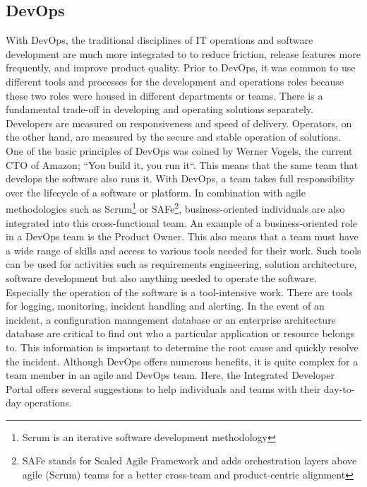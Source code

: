 \documentclass[a4paper,12pt]{article}
\begin{document}
    \subsection{DevOps}
    \label{subsec:devops}
    With DevOps, the traditional disciplines of IT operations and software development are much more integrated to
    to reduce friction, release features more frequently, and improve product quality\parencite{safedevops}.
    Prior to DevOps, it was common to use different tools and processes for the development and operations roles
    because these two roles were housed in different departments or teams.
    There is a fundamental trade-off in developing and operating solutions separately.
    Developers are measured on responsiveness and speed of delivery.
    Operators, on the other hand, are measured by the secure and stable operation of solutions.
    One of the basic principles of DevOps was coined by Werner Vogels, the current CTO of Amazon;
    ``You build it, you run it``\parencite{vogels}.
    This means that the same team that develops the software also runs it.
    With DevOps, a team takes full responsibility over the lifecycle of a software or platform.
    In combination with agile methodologies such as Scrum\footnote{Scrum is an iterative software development methodology}
    or SAFe\footnote{SAFe stands for Scaled Agile Framework and adds orchestration layers above agile (Scrum) teams for
    a better cross-team and product-centric alignment}, business-oriented individuals are also integrated into this
    cross-functional team.
    An example of a business-oriented role in a DevOps team is the Product Owner\parencite{safepo}.
    This also means that a team must have a wide range of skills and access to various tools needed for their work.
    Such tools can be used for activities such as requirements engineering, solution architecture, software development
    but also anything needed to operate the software.
    Especially the operation of the software is a tool-intensive work.
    There are tools for logging, monitoring, incident handling and alerting.
    In the event of an incident, a configuration management database or an enterprise architecture database are critical
    to find out who a particular application or resource belongs to.
    This information is important to determine the root cause and quickly resolve the incident.
    Although DevOps offers numerous benefits, it is quite complex for a team member in an agile and DevOps team.
    Here, the Integrated Developer Portal offers several suggestions to help individuals and teams with their day-to-day operations.
\end{document}
